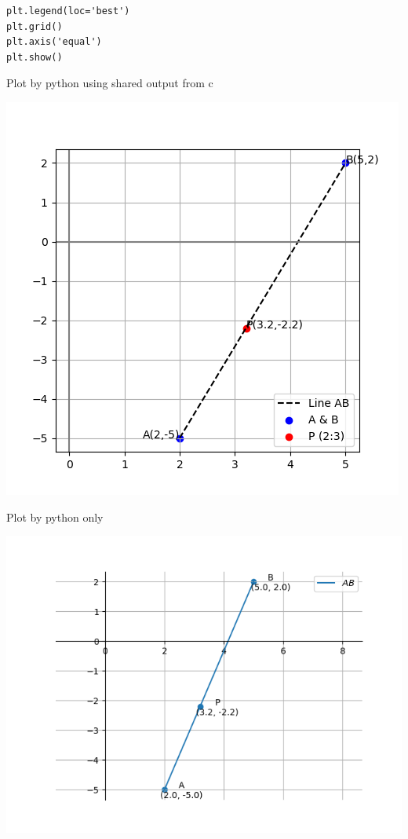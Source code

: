 \documentclass{beamer}
\begin{document}
\begin{frame}[fragile]

\begin{lstlisting}
plt.legend(loc='best')
plt.grid()
plt.axis('equal')
plt.show()
\end{lstlisting}
\end{frame}


\begin{frame}{Plot by python using shared output from c}
	\begin{center}
		\includegraphics[width=0.6\columnwidth]{figs/fig_1.png}
	\end{center}
\end{frame}

\begin{frame}{Plot by python only}
	\begin{center}
		\includegraphics[width=0.8\columnwidth]{figs/fig_2.png}
	\end{center}
\end{frame}
\end{document}
